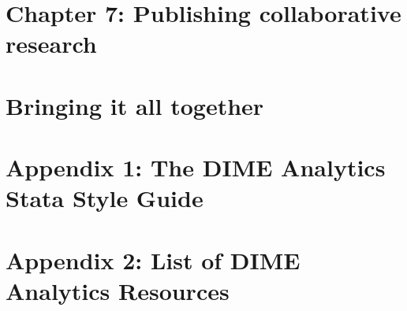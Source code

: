 \chapter{Chapter 7: Publishing collaborative research}
\label{ch:7}




\chapter{Bringing it all together}




\chapter{Appendix 1: The DIME Analytics Stata Style Guide}
\label{ap:1}




\chapter{Appendix 2: List of DIME Analytics Resources}
\label{ap:2}





\backmatter




\printindex %


